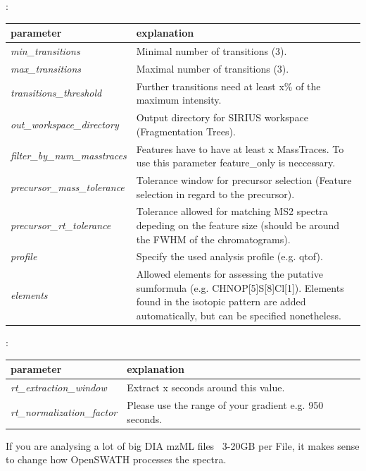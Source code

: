 \noindent{}:
\begin{center}
\begin{tabular*}{\textwidth}{ p{5.5cm}|p{10.5cm} }
\textbf{parameter} & \textbf{explanation} \\ \hline
\textit{min\_transitions} & Minimal number of transitions (3). \\
\textit{max\_transitions} &  Maximal number of transitions (3). \\
\textit{transitions\_threshold} & Further transitions need at least x\% of the maximum intensity. \\
\textit{out\_workspace\_directory} & Output directory for SIRIUS workspace (Fragmentation Trees). \\
\textit{filter\_by\_num\_masstraces} &  Features have to have at least x MassTraces. To use this parameter feature\_only is neccessary. \\
\textit{precursor\_mass\_tolerance} & Tolerance window for precursor selection (Feature selection in regard to the precursor). \\
\textit{precursor\_rt\_tolerance} & Tolerance allowed for matching MS2 spectra depeding on the feature size (should be around the FWHM of the chromatograms). \\
\textit{profile} & Specify the used analysis profile (e.g. qtof). \\
\textit{elements} & Allowed elements for assessing the putative sumformula (e.g. CHNOP[5]S[8]Cl[1]). Elements found in the isotopic pattern are added automatically, but can be specified nonetheless. \\
\end{tabular*}
\end{center}

\noindent{}:
\begin{center}
\begin{tabular*}{\textwidth}{ p{5.5cm}|p{10.5cm} }
\textbf{parameter} & \textbf{explanation} \\ \hline
\textit{rt\_extraction\_window} & Extract x seconds around this value. \\
\textit{rt\_normalization\_factor} &  Please use the range of your gradient e.g. 950 seconds. \\
\end{tabular*}
\end{center} 

\noindent If you are analysing a lot of big DIA mzML files ~3-20GB per File, it makes sense to  change how OpenSWATH processes the spectra. 

